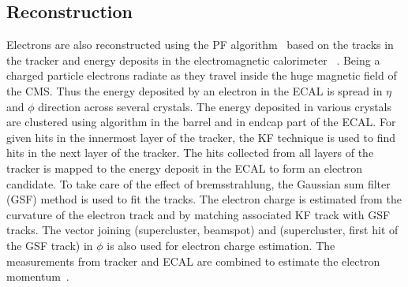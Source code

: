 \subsection{Reconstruction}
Electrons are also reconstructed using the PF algorithm~\cite{CMS-PAS-PFT-09-001, CMS-PAS-PFT-10-001} 
based on the tracks in the tracker and energy deposits in the electromagnetic calorimeter
~\cite{Khachatryan:2015hwa}. Being a charged particle electrons radiate as they travel inside the huge
magnetic field of the CMS. Thus the energy deposited by an electron in the ECAL is
spread in $\eta$ and $\phi$ direction across several crystals. The energy deposited
in various crystals are clustered using  algorithm in the barrel and 
in endcap part of the ECAL. For given hits in the innermost layer of the tracker, the 
KF technique is used to find hits in the next layer of the tracker. The hits collected from all layers 
of the tracker is mapped to the energy deposit in the ECAL to form 
an electron candidate. To take care of the effect of bremsstrahlung, the Gaussian sum 
filter (GSF) method is used to fit the tracks. The electron charge is estimated from the 
curvature of the electron track and by matching associated KF track with GSF tracks. The vector joining (supercluster, beamspot) and (supercluster, first hit of the GSF track) in $\phi$ is also used for
electron charge estimation. The measurements from tracker and ECAL are combined to estimate
the electron momentum~\cite{Khachatryan:2015hwa}.


